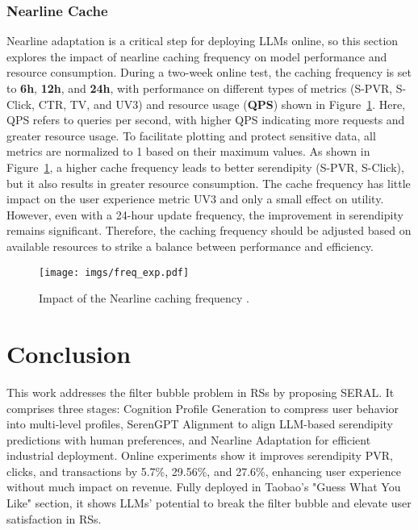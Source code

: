 \subsubsection{Nearline Cache} 
Nearline adaptation is a critical step for deploying LLMs online, so this section explores the impact of nearline caching frequency on model performance and resource consumption. During a two-week online test, the caching frequency is set to \textbf{6h}, \textbf{12h}, and \textbf{24h}, with performance on different types of metrics (S-PVR, S-Click, CTR, TV, and UV3) and resource usage (\textbf{QPS}) shown in Figure~\ref{fig:cache}. Here, QPS refers to queries per second, with higher QPS indicating more requests and greater resource usage. To facilitate plotting and protect sensitive data, all metrics are normalized to 1 based on their maximum values. As shown in Figure~\ref{fig:cache}, a higher cache frequency leads to better serendipity (S-PVR, S-Click), but it also results in greater resource consumption. The cache frequency has little impact on the user experience metric UV3 and only a small effect on utility. However, even with a 24-hour update frequency, the improvement in serendipity remains significant. Therefore, the caching frequency should be adjusted based on available resources to strike a balance between performance and efficiency.

\begin{figure}
    \centering
    \vspace{-10pt}
    \texttt{[image: imgs/freq\_exp.pdf]}
    \vspace{-20pt}
    \caption{Impact of the Nearline caching frequency .}
    \vspace{-10pt}
    \label{fig:cache}
\end{figure}






\section{Conclusion}
This work addresses the filter bubble problem in RSs by proposing  SERAL. It comprises three stages: Cognition Profile Generation to compress user behavior into multi-level profiles, SerenGPT Alignment to align LLM-based serendipity predictions with human preferences, and Nearline Adaptation for efficient industrial deployment. Online experiments show it improves serendipity PVR, clicks, and transactions by 5.7\%, 29.56\%, and 27.6\%, enhancing user experience without much impact on revenue. Fully deployed in Taobao’s "Guess What You Like" section, it shows LLMs' potential to break the filter bubble and elevate user satisfaction in RSs.